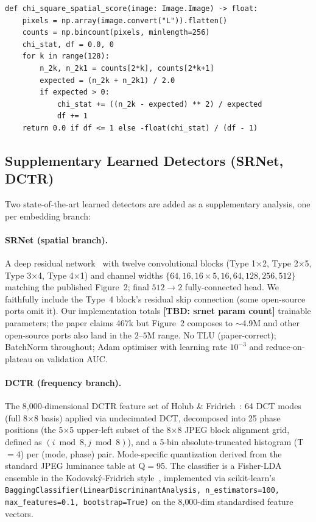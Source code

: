 \documentclass[10pt,twocolumn,a4paper]{article}
\newcommand{\TBD}[1]{\textbf{\color{red}[TBD: #1]}}
\begin{document}
\begin{lstlisting}[label={lst:chispatial},caption={Spatial $\chi^2$ (Westfeld~1999) on a grayscale image, with the underflow-free score transformation. The classical p-value is replaced by $-\chi^2/df$ which is rank-monotonic with the p-value on non-degenerate inputs but does not collapse to zero on large textured images.}]
def chi_square_spatial_score(image: Image.Image) -> float:
    pixels = np.array(image.convert("L")).flatten()
    counts = np.bincount(pixels, minlength=256)
    chi_stat, df = 0.0, 0
    for k in range(128):
        n_2k, n_2k1 = counts[2*k], counts[2*k+1]
        expected = (n_2k + n_2k1) / 2.0
        if expected > 0:
            chi_stat += ((n_2k - expected) ** 2) / expected
            df += 1
    return 0.0 if df <= 1 else -float(chi_stat) / (df - 1)
\end{lstlisting}

\subsection{Supplementary Learned Detectors (SRNet, DCTR)}
\label{sec:learned-detectors}

Two state-of-the-art learned detectors are added as a supplementary analysis, one per embedding branch:

\paragraph{SRNet (spatial branch).} A deep residual network~\cite{boroumand2019srnet} with twelve convolutional blocks (Type 1$\times$2, Type 2$\times$5, Type 3$\times$4, Type 4$\times$1) and channel widths $\{64,16,16{\times}5,16,64,128,256,512\}$ matching the published Figure~2; final $512{\rightarrow}2$ fully-connected head. We faithfully include the Type~4 block's residual skip connection (some open-source ports omit it). Our implementation totals \TBD{srnet param count} trainable parameters; the paper claims 467k but Figure~2 composes to $\sim$4.9M and other open-source ports also land in the $2$--$5$M range. No TLU (paper-correct); BatchNorm throughout; Adam optimiser with learning rate $10^{-3}$ and reduce-on-plateau on validation AUC.

\paragraph{DCTR (frequency branch).} The 8{,}000-dimensional DCTR feature set of Holub \& Fridrich~\cite{holub2015dctr}: 64 DCT modes (full 8$\times$8 basis) applied via undecimated DCT, decomposed into 25 phase positions (the 5$\times$5 upper-left subset of the 8$\times$8 JPEG block alignment grid, defined as $(i\bmod 8, j\bmod 8)$), and a 5-bin absolute-truncated histogram (T$=$4) per (mode, phase) pair. Mode-specific quantization derived from the standard JPEG luminance table at Q$=$95. The classifier is a Fisher-LDA ensemble in the Kodovsk\'{y}-Fridrich style~\cite{fridrich2012srm}, implemented via scikit-learn's \texttt{BaggingClassifier(LinearDiscriminantAnalysis, n\_estimators=100, max\_features=0.1, bootstrap=True)} on the 8{,}000-dim standardised feature vectors.
\end{document}
